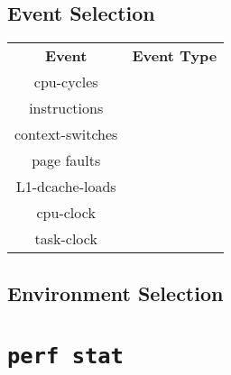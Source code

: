 \documentclass{article}
\begin{document}
\subsection{Event Selection}
\begin{center}
    \begin{tabular}{c|c}
        \hline
        \textbf{Event} & \textbf{Event Type}  \\
         cpu-cycles & \\
         instructions & \\
         context-switches & \\
         page faults & \\
         L1-dcache-loads & \\
         cpu-clock & \\
         task-clock & \\

    \end{tabular}
\end{center}
\subsection{Environment Selection}
\pagebreak
\section{\texttt{perf stat}}
\end{document}
